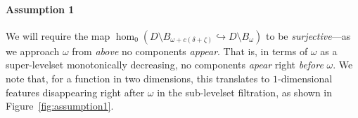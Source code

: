 \paragraph{Assumption 1}

We will require the map $\hom_0(D\setminus B_{\omega+c(\delta+\zeta)}\hookrightarrow D\setminus B_\omega)$ to be \emph{surjective}---as we approach $\omega$ from \emph{above} no components \emph{appear}.
That is, in terms of $\omega$ as a super-levelset monotonically decreasing, no components \emph{apear} right \emph{before} $\omega$.
We note that, for a function in two dimensions, this translates to $1$-dimensional features disappearing right after $\omega$ in the sub-levelset filtration, as shown in Figure~\ref{fig:assumption1}.

